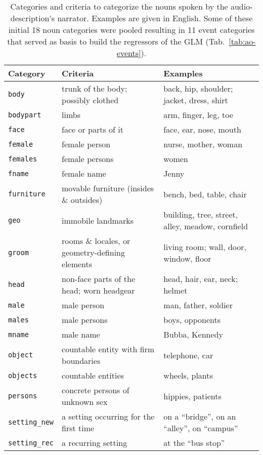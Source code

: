 \documentclass[english]{article}
\begin{document}
\begin{table*}[tbp]
    \caption{Categories and criteria to categorize the nouns spoken by
        the audio-description's narrator.
        Examples are given in English.
        Some of these initial 18 noun categories were pooled resulting in 11
        event categories that served as basis to build the regressors of the
        GLM
        (Tab.~\ref{tab:ao-events}).
}
\label{tab:descr-nouns-rules}
\begin{tabular}{lp{61mm}p{61mm}}
\toprule
\textbf{Category} & \textbf{Criteria} & \textbf{Examples} \\
\midrule
\texttt{body} & trunk of the body; possibly clothed & back, hip, shoulder; jacket, dress, shirt
\tabularnewline
\texttt{bodypart} & limbs & arm, finger, leg, toe
\tabularnewline
\texttt{face} & face or parts of it & face, ear, nose, mouth
\tabularnewline
\texttt{female} & female person & nurse, mother, woman
\tabularnewline
\texttt{females} & female persons & women
\tabularnewline
\texttt{fname} & female name & Jenny
\tabularnewline
\texttt{furniture} & movable furniture (insides \& outsides) & bench, bed, table, chair
\tabularnewline
\texttt{geo} & immobile landmarks & building, tree, street, alley, meadow, cornfield
\tabularnewline
\texttt{groom} & rooms \& locales, or geometry-defining elements & living room; wall, door, window, floor
\tabularnewline
\texttt{head} & non-face parts of the head; worn headgear & head, hair, ear, neck;
helmet
\tabularnewline
\texttt{male} & male person & man, father, soldier
\tabularnewline
\texttt{males} & male persons & boys, opponents
\tabularnewline
\texttt{mname} & male name & Bubba, Kennedy
\tabularnewline
\texttt{object} & countable entity with firm boundaries & telephone, car
\tabularnewline
\texttt{objects} & countable entities & wheels, plants
\tabularnewline
\texttt{persons} & concrete persons of unknown sex & hippies, patients
\tabularnewline
\texttt{setting\_new} & a setting occurring for the first time & on a ``bridge'', on an ``alley'', on ``campus''
\tabularnewline
\texttt{setting\_rec} & a recurring setting & at the ``bus stop'' \tabularnewline
\bottomrule
\end{tabular}
\end{table*}
\end{document}

